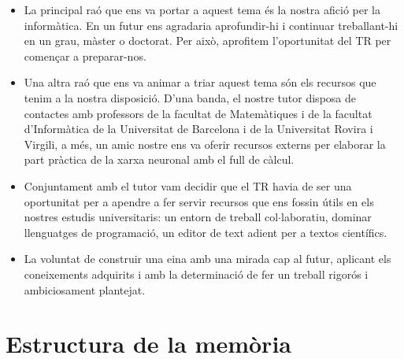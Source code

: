 \begin{itemize}
 \item La principal raó que ens va portar a aquest tema és la nostra afició per la informàtica. En un futur ens agradaria aprofundir-hi i continuar treballant-hi en un grau, màster o doctorat. Per això, aprofitem l’oportunitat del TR per començar a preparar-nos.

 \item Una altra raó que ens va animar a triar aquest tema són els recursos que tenim a la nostra disposició. D'una banda, el nostre tutor disposa de contactes amb professors de la facultat de Matemàtiques i de la facultat d'Informàtica de la Universitat de Barcelona i de la Universitat Rovira i Virgili, a més, un amic nostre ens va oferir recursos externs per elaborar la part pràctica de la xarxa neuronal amb el full de càlcul.
%

 \item Conjuntament amb el tutor vam decidir que el TR havia de ser una oportunitat per a apendre a fer servir recursos que ens fossin útils en els nostres estudis universitaris: un entorn de treball col$\cdot$laboratiu, dominar llenguatges de programació, un editor de text adient per a textos científics.

 \item La voluntat de construir una eina amb una mirada cap al futur, aplicant els coneixements adquirits i amb la determinació de fer un treball rigorós i ambiciosament plantejat.
\end{itemize}

\section{Estructura de la memòria}

